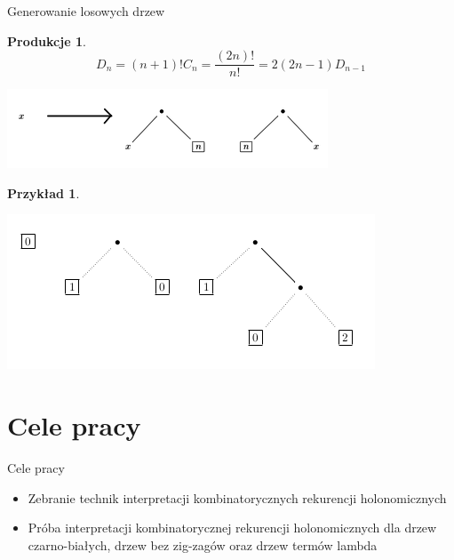 \documentclass[final]{beamer}
\theoremstyle{bluetheorem}
\theoremstyle{bluetheorem}
\newtheorem{myproductions}[mytheorem]{Produkcje}
\theoremstyle{greentheorem}
\newtheorem{myexample}[mytheorem]{Przykład}
\begin{document}
\begin{frame}{Generowanie losowych drzew}
    \begin{myproductions}
        \[D_n = (n + 1)! C_n = \frac{(2n)!}{n!} = 2 (2n - 1) D_{n-1}\]
        \begin{center}
            \includegraphics[width=.6\textwidth]{gen_001.png}
        \end{center}
    \end{myproductions}

    \begin{myexample}
        \begin{center}
            \includegraphics[width=.6\textwidth]{gen_002.png}
        \end{center}
    \end{myexample}
\end{frame}

\section{Cele pracy}

\begin{frame}{Cele pracy}
    \begin{itemize}
        \item Zebranie technik interpretacji kombinatorycznych rekurencji holonomicznych
        \item Próba interpretacji kombinatorycznej rekurencji holonomicznych dla drzew czarno-białych, drzew bez zig-zagów oraz drzew termów lambda
    \end{itemize}
\end{frame}
\end{document}
